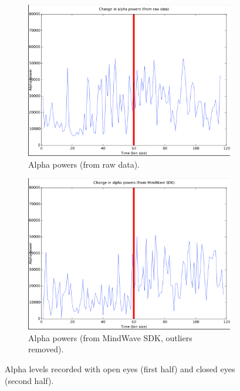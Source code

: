 \documentclass[a4paper,10pt,english,lof,lot,twoside]{puthesis}
\begin{document}
\begin{figure}
\centering
\capstart
\begin{subfigure}[t]{0.48\linewidth}
\centering
\capstart

\includegraphics[width=1.000\linewidth]{alpha-bin-2s-raw-eeg.png}
\caption[Alpha powers (from raw data)]{Alpha powers (from raw data).}\label{ch-experiment/index:fig-experiment-alpha-bin-2s-raw-eeg}\end{subfigure}
\begin{subfigure}[t]{0.48\linewidth}
\centering
\capstart

\includegraphics[width=1.000\linewidth]{alpha-bin-2s-sdk.png}
\caption[Alpha powers (from MindWave SDK)]{Alpha powers (from MindWave SDK, outliers removed).}\label{ch-experiment/index:fig-experiment-alpha-bin-2s-sdk}\end{subfigure}
\caption[Alpha levels recorded with open eyes (first half) and closed eyes (second half)]{Alpha levels recorded with open eyes (first half) and closed eyes (second half).}\label{ch-experiment/index:fig-early-open-closed-experiments}

\end{figure}
\end{document}
